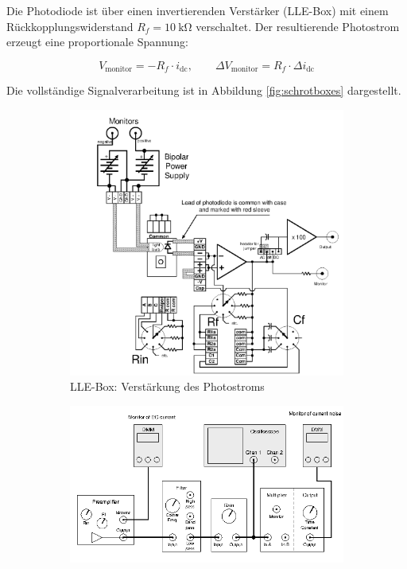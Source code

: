 Die Photodiode ist über einen invertierenden Verstärker (LLE-Box) mit einem Rückkopplungswiderstand \( R_f = \SI{10}{\kilo\ohm} \) verschaltet. Der resultierende Photostrom erzeugt eine proportionale Spannung:

\begin{equation}
    V_{\text{monitor}} = - R_f \cdot i_{\text{dc}}, \qquad \Delta V_{\text{monitor}} = R_f \cdot \Delta i_{\text{dc}}
\end{equation}

Die vollständige Signalverarbeitung ist in Abbildung \ref{fig:schrotboxes} dargestellt.

\FloatBarrier
\begin{figure}[htbp]
    \centering
    \begin{subfigure}[t]{0.48\textwidth}
        \centering
        \includegraphics[width=\textwidth]{figs/schrot lle.png}
        \caption{LLE-Box: Verstärkung des Photostroms}
        \label{fig:schrotlle}
    \end{subfigure}
    \hfill
    \begin{subfigure}[t]{0.48\textwidth}
        \centering
        \includegraphics[width=\textwidth]{figs/schrot hle.png}

\end{subfigure}
\end{figure}

